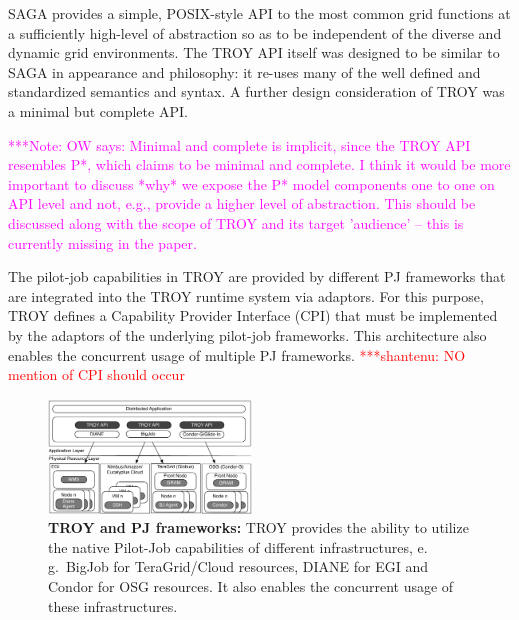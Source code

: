 \documentclass[conference,final]{IEEEtran}
\newcommand{\jhanote}[1]{ {\textcolor{red} { ***shantenu: #1 }}}
\newcommand{\note}[1]{ {\textcolor{magenta} { ***Note: #1 }}}
\newcommand{\jhanote}[1]{}
\newcommand{\note}[1]{}
\newcommand{\upp}{\vspace*{-0.5em}}
\begin{document}
SAGA provides a simple, POSIX-style API to the most common grid
functions at a sufficiently high-level of abstraction so as to be
independent of the diverse and dynamic grid environments. The TROY API
itself was designed to be similar to SAGA in appearance and
philosophy: it re-uses many of the well defined and standardized
semantics and syntax. A further design consideration of TROY was a
minimal but complete API.

\note{OW says: Minimal and complete is implicit, since the TROY API
resembles P*, which claims to be minimal and complete. I think it would 
be more important to discuss *why* we expose the P* model components one to one
on API level and not, e.g., provide a higher level of abstraction.
This should be discussed along with the scope of TROY and its
target 'audience' -- this is currently missing in the paper.}

The pilot-job capabilities in TROY are provided by different PJ
frameworks that are integrated into the TROY runtime system via
adaptors. For this purpose, TROY defines a Capability Provider
Interface (CPI) that must be implemented by the adaptors of the
underlying pilot-job frameworks. This architecture also enables the
concurrent usage of multiple PJ frameworks.  \jhanote{NO mention of
  CPI should occur}

\begin{figure}[t]
    \centering
\upp
    \includegraphics[width=0.48\textwidth]{figures/distributed_pilot_job.pdf}
    \caption{\textbf{TROY and PJ frameworks:} TROY provides the
      ability to utilize the native Pilot-Job capabilities of
      different infrastructures, e.\,g.\ BigJob for TeraGrid/Cloud
      resources, DIANE for EGI and Condor for OSG resources. It also
      enables the concurrent usage of these infrastructures.
	\upp\upp\upp}
    \label{fig:figures_distributed_pilot_job}
\end{figure}

\end{document}
